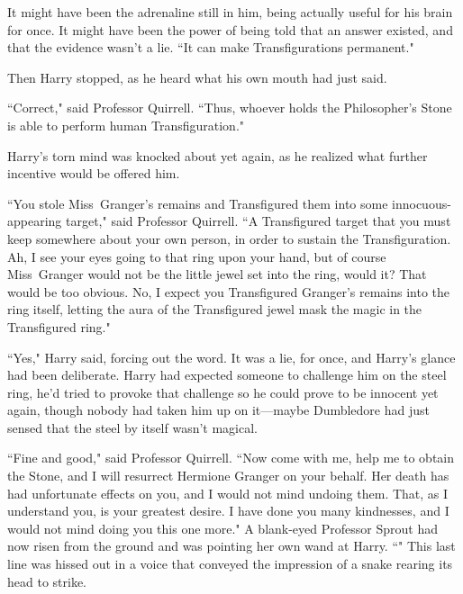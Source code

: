 It might have been the adrenaline still in him, being actually useful for his brain for once. It might have been the power of being told that an answer existed, and that the evidence wasn't a lie. ``It can make Transfigurations permanent."

Then Harry stopped, as he heard what his own mouth had just said.

``Correct," said Professor Quirrell. ``Thus, whoever holds the Philosopher's Stone is able to perform human Transfiguration."

Harry's torn mind was knocked about yet again, as he realized what further incentive would be offered him.

``You stole Miss~Granger's remains and Transfigured them into some innocuous-appearing target," said Professor Quirrell. ``A Transfigured target that you must keep somewhere about your own person, in order to sustain the Transfiguration. Ah, I see your eyes going to that ring upon your hand, but of course Miss~Granger would not be the little jewel set into the ring, would it? That would be too obvious. No, I expect you Transfigured Granger's remains into the ring itself, letting the aura of the Transfigured jewel mask the magic in the Transfigured ring."

``Yes," Harry said, forcing out the word. It was a lie, for once, and Harry's glance had been deliberate. Harry had expected someone to challenge him on the steel ring, he'd tried to provoke that challenge so he could prove to be innocent yet again, though nobody had taken him up on it—maybe Dumbledore had just sensed that the steel by itself wasn't magical.

``Fine and good," said Professor Quirrell. ``Now come with me, help me to obtain the Stone, and I will resurrect Hermione Granger on your behalf. Her death has had unfortunate effects on you, and I would not mind undoing them. That, as I understand you, is your greatest desire. I have done you many kindnesses, and I would not mind doing you this one more." A blank-eyed Professor Sprout had now risen from the ground and was pointing her own wand at Harry. ``" This last line was hissed out in a voice that conveyed the impression of a snake rearing its head to strike.

\later

